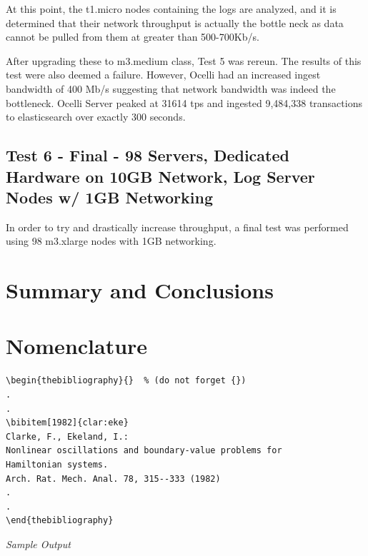 \documentclass{llncs}
\begin{document}
At this point, the t1.micro nodes containing the logs are analyzed, and it is determined that their network throughput is actually the bottle neck as data cannot be pulled from them at greater than 500-700Kb/s. 

After upgrading these to m3.medium class, Test 5 was rereun. The results of this test were also deemed a failure. However, Ocelli had an increased ingest bandwidth of 400 Mb/s suggesting that network bandwidth was indeed the bottleneck. Ocelli Server peaked at 31614 tps and ingested 9,484,338 transactions to elasticsearch over exactly 300 seconds. 

\subsection{Test 6 - Final - 98 Servers, Dedicated Hardware on 10GB Network, Log Server Nodes w/ 1GB Networking}

In order to try and drastically increase throughput, a final test was performed using 98 m3.xlarge nodes with 1GB networking.

\section{Summary and Conclusions}
\section{Nomenclature}
\newpage
\begin{verbatim}
\begin{thebibliography}{}  % (do not forget {})
.
.
\bibitem[1982]{clar:eke}
Clarke, F., Ekeland, I.:
Nonlinear oscillations and boundary-value problems for
Hamiltonian systems.
Arch. Rat. Mech. Anal. 78, 315--333 (1982)
.
.
\end{thebibliography}
\end{verbatim}
{\itshape Sample Output}
\bibauthoryear
%
\end{document}
